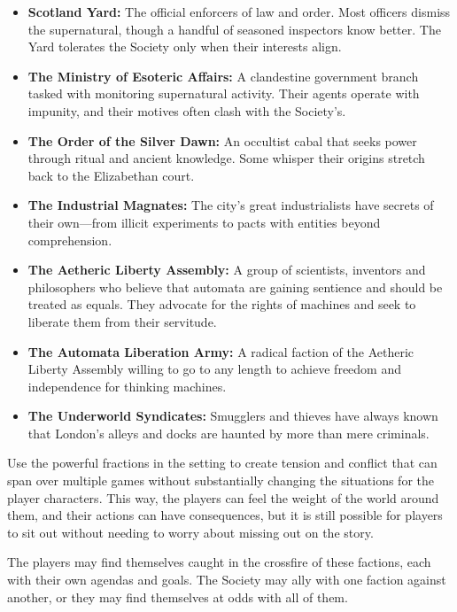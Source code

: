 \begin{itemize}\raggedright
    \item \textbf{Scotland Yard:} The official enforcers of law and order. Most officers dismiss the supernatural, though a handful of seasoned inspectors know better. The Yard tolerates the Society only when their interests align.
    
    \item \textbf{The Ministry of Esoteric Affairs:} A clandestine government branch tasked with monitoring supernatural activity. Their agents operate with impunity, and their motives often clash with the Society’s.
    
    \item \textbf{The Order of the Silver Dawn:} An occultist cabal that seeks power through ritual and ancient knowledge. Some whisper their origins stretch back to the Elizabethan court.
    
    \item \textbf{The Industrial Magnates:} The city’s great industrialists have secrets of their own—from illicit experiments to pacts with entities beyond comprehension.

    \item \textbf{The Aetheric Liberty Assembly:} A group of scientists, inventors and philosophers who believe that automata are gaining sentience and should be treated as equals. They advocate for the rights of machines and seek to liberate them from their servitude.
    
    \item \textbf{The Automata Liberation Army:} A radical faction of the Aetheric Liberty Assembly willing to go to any length to achieve freedom and independence for thinking machines.
    
    \item \textbf{The Underworld Syndicates:} Smugglers and thieves have always known that London’s alleys and docks are haunted by more than mere criminals.
\end{itemize}

Use the powerful fractions in the setting to create tension and conflict that can span over multiple games without substantially changing the situations for the player characters. This way, the players can feel the weight of the world around them, and their actions can have consequences, but it is still possible for players to sit out without needing to worry about missing out on the story.

The players may find themselves caught in the crossfire of these factions, each with their own agendas and goals. The Society may ally with one faction against another, or they may find themselves at odds with all of them.

